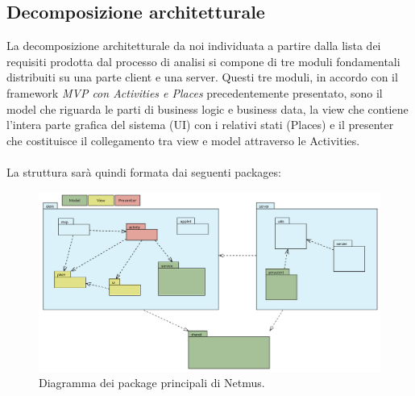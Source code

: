 \newpage
\subsection{Decomposizione architetturale}
La decomposizione architetturale da noi individuata a partire dalla lista dei
requisiti prodotta dal processo di analisi si compone di tre moduli
fondamentali distribuiti su una parte client e una server. Questi tre moduli, in
accordo con il framework \emph{MVP con Activities e Places} precedentemente
presentato, sono il model che riguarda le parti di business logic e business
data, la view che contiene l'intera parte grafica del sistema (UI) con i
relativi stati (Places) e il presenter che costituisce il collegamento tra view
e model attraverso le Activities.
\\\\
La struttura sar\`a quindi formata dai seguenti packages:
\begin{figure}[h]
  \centering
  \includegraphics[width=16cm]{img/ST/PackageGeneric.png}
\caption{Diagramma dei package principali di Netmus.}
\end{figure}

